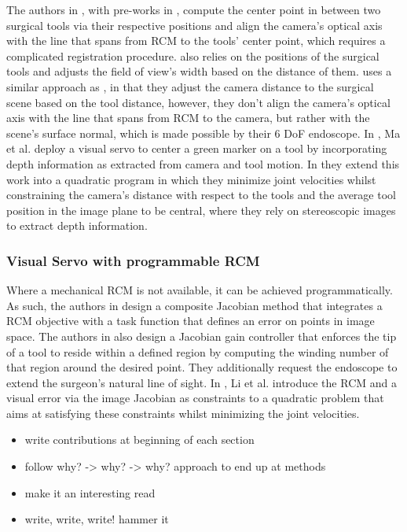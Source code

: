 The authors in \cite{eslamian2020development, mariani2020experimental, dascan}, with pre-works in \cite{Eslamian2016TowardsTI, eslamian2017autonomous}, compute the center point in between two surgical tools via their respective positions and align the camera's optical axis with the line that spans from RCM to the tools' center point, which requires a complicated registration procedure. \cite{yu2016automatic} also relies on the positions of the surgical tools and adjusts the field of view's width based on the distance of them. \cite{abdelaal2020orientation} uses a similar approach as \cite{eslamian2020development}, in that they adjust the camera distance to the surgical scene based on the tool distance, however, they don't align the camera's optical axis with the line that spans from RCM to the camera, but rather with the scene's surface normal, which is made possible by their 6 DoF endoscope. In \cite{ma2019autonomous}, Ma et al. deploy a visual servo to center a green marker on a tool by incorporating depth information as extracted from camera and tool motion. In \cite{ma2020visual} they extend this work into a quadratic program in which they minimize joint velocities whilst constraining the camera's distance with respect to the tools and the average tool position in the image plane to be central, where they rely on stereoscopic images to extract depth information. 

\subsubsection{Visual Servo with programmable RCM}
Where a mechanical RCM is not available, it can be achieved programmatically. As such, the authors in \cite{aghakhani2013task} design a composite Jacobian method that integrates a RCM objective with a task function that defines an error on points in image space. The authors in \cite{yang2019adaptive} also design a Jacobian gain controller that enforces the tip of a tool to reside within a defined region by computing the winding number of that region around the desired point. They additionally request the endoscope to extend the surgeon's natural line of sight. In \cite{li2020accelerated}, Li et al. introduce the RCM and a visual error via the image Jacobian as constraints to a quadratic problem that aims at satisfying these constraints whilst minimizing the joint velocities. 

\begin{itemize}
    \item write contributions at beginning of each section
    \item follow why? -> why? -> why? approach to end up at methods
    \item make it an interesting read
    \item write, write, write! hammer it
\end{itemize}

